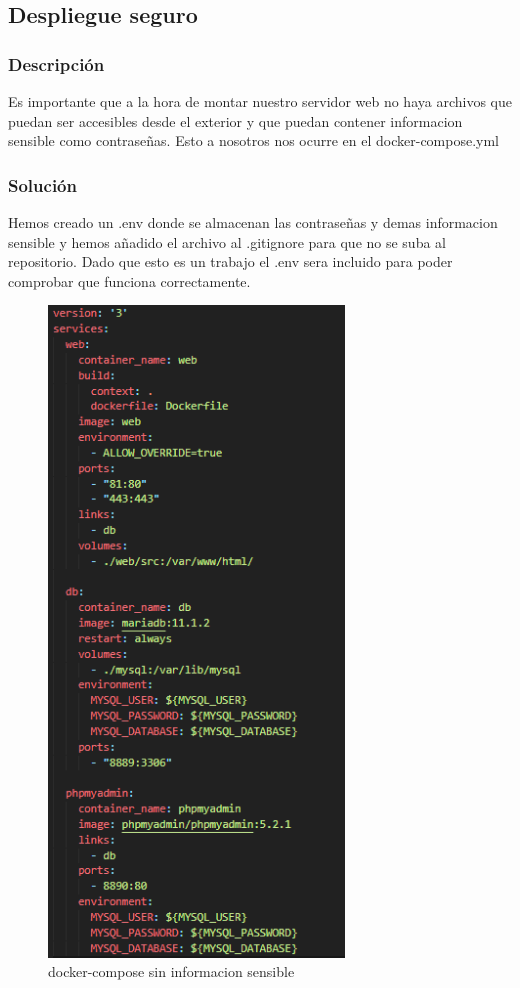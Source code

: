 \documentclass{report}
\begin{document}
            \subsection{Despliegue seguro}
                \subsubsection{Descripción}
                    Es importante que a la hora de montar nuestro servidor web no haya archivos que puedan ser accesibles desde el exterior y que puedan contener informacion sensible como contraseñas. Esto a nosotros nos ocurre en el docker-compose.yml
                \subsubsection{Solución}
                    Hemos creado un .env donde se almacenan las contraseñas y demas informacion sensible y hemos añadido el archivo al .gitignore para que no se suba al repositorio.
                    Dado que esto es un trabajo el .env sera incluido para poder comprobar que funciona correctamente.
                    \begin{figure}[H]
                        \centering
                        \includegraphics[width=0.7\textwidth]{./img/vulnerabilidades/3.5/1.1.png}
                        \caption{docker-compose sin informacion sensible}
                    \end{figure}
            \clearpage
\end{document}

